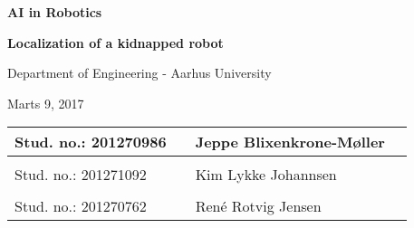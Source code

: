 
\centerline{\Huge\bfseries\color{ThemeColor} AI in Robotics}

\vspace{1em}
\centerline{\Large\bfseries\color{BlackColor} Localization of a kidnapped robot}



\vspace{5em}
\centerline{\large\bfseries\color{BlackColor}}
\centerline{\large\color{BlackColor}Department of Engineering - Aarhus University}

\vspace{0.5em}
\centerline{\large\color{BlackColor} Marts 9, 2017}

\vspace{25em}

\begin{center}
   \begin{tabular}{ l p{3cm} l l }
   Stud. no.: 201270986 && Jeppe Blixenkrone-Møller & \\\hline
   & & \\
   Stud. no.: 201271092 && Kim Lykke Johannsen & \\\hline
   & & \\
   Stud. no.: 201270762 && René Rotvig Jensen & \\\hline
   \end{tabular}
\end{center}
\thispagestyle{empty} %
\restoregeometry

